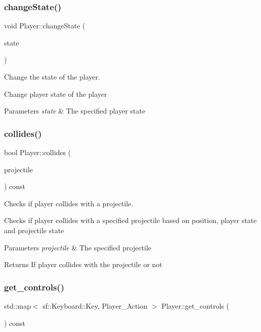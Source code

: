 \subsubsection{\texorpdfstring{change\+State()}{changeState()}}
{\footnotesize\ttfamily void Player\+::change\+State (\begin{DoxyParamCaption}\item[{Player\+\_\+\+State}]{state }\end{DoxyParamCaption})}



Change the state of the player. 

Change player state of the player 
\begin{DoxyParams}{Parameters}
{\em state} & The specified player state \\
\hline
\end{DoxyParams}
\mbox{\label{classPlayer_a5257af396fd0c0623fdf8baf0a9a634b}} 
\subsubsection{\texorpdfstring{collides()}{collides()}}
{\footnotesize\ttfamily bool Player\+::collides (\begin{DoxyParamCaption}\item[{\hyperlink{classProjectile}{Projectile} const \&}]{projectile }\end{DoxyParamCaption}) const}



Checks if player collides with a projectile. 

Checks if player collides with a specified projectile based on position, player state and projectile state 
\begin{DoxyParams}{Parameters}
{\em projectile} & The specified projectile \\
\hline
\end{DoxyParams}
\begin{DoxyReturn}{Returns}
If player collides with the projectile or not 
\end{DoxyReturn}
\mbox{\label{classPlayer_af6527c6b10c6c421b07064db039c03e6}} 
\subsubsection{\texorpdfstring{get\+\_\+controls()}{get\_controls()}}
{\footnotesize\ttfamily std\+::map$<$ sf\+::\+Keyboard\+::\+Key, Player\+\_\+\+Action $>$ Player\+::get\+\_\+controls (\begin{DoxyParamCaption}{ }\end{DoxyParamCaption}) const}



